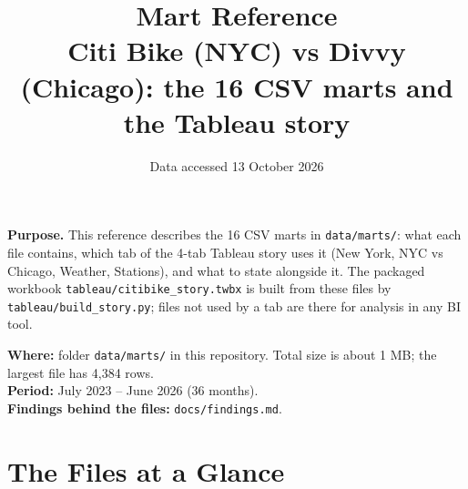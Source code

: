 \documentclass[11pt,a4paper]{article}
\title{\color{accent}\textbf{Mart Reference}\\[4pt]
\large Citi Bike (NYC) vs Divvy (Chicago): the 16 CSV marts and the Tableau story}
\date{Data accessed 13 October 2026}
\newcommand{\f}[1]{\texttt{\small #1}}
\begin{document}
\maketitle

\textbf{Purpose.} This reference describes the 16 CSV marts in \f{data/marts/}: what each file contains, which tab of the 4-tab Tableau story uses it (New York, NYC vs Chicago, Weather, Stations), and what to state alongside it. The packaged workbook \f{tableau/citibike\_story.twbx} is built from these files by \f{tableau/build\_story.py}; files not used by a tab are there for analysis in any BI tool.

\textbf{Where:} folder \f{data/marts/} in this repository. Total size is about 1 MB; the largest file has 4{,}384 rows.\\
\textbf{Period:} July 2023 -- June 2026 (36 months).\\
\textbf{Findings behind the files:} \f{docs/findings.md}.

\section{The Files at a Glance}
\end{document}

